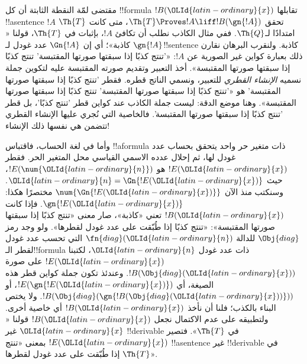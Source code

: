 \documentclass[../../../include/open-logic-section]{subfiles}
\begin{document}


\begin{explain}
مقتضى لمّة النقطة الثابتة أن كل !!{formula} $!B(\OLId{latin-ordinary}{x})$ تقابلها
!!a{sentence} $!A$ تحقق $\Th{T}\Proves !A\liff !B(\gn{!A})$،
متى كانت $\Th{T}$ امتدادًا لـ$\Th{Q}$. ففي مثال الكاذب نطلب
أن تكافئ $!A$، بإثبات في $\Th{T}$، قولنا «$\gn{!A}$ كاذبة»؛
أي إن $\Gn{!A}$ عدد غودل لـ!!{sentence} كاذبة. ولنقرب البرهان
نقارن ذلك بعبارة كواين غير الصورية عن $!A$: «'تنتج كذبًا إذا
سبقتها صورتها المقتبسة' تنتج كذبًا إذا سبقتها صورتها المقتبسة».
أخذ التعبير وتقديم صورته المقتبسة عليه لتكوين جملة نسميه
\emph{الإنشاء القطري} للتعبير، ونسمي الناتج قطره.
فقطر 'تنتج كذبًا إذا سبقتها صورتها المقتبسة' هو «'تنتج كذبًا إذا
سبقتها صورتها المقتبسة' تنتج كذبًا إذا سبقتها صورتها المقتبسة».
وهنا موضع الدقة: ليست جملة الكاذب عند كواين قطر 'تنتج كذبًا'،
بل قطر 'تنتج كذبًا إذا سبقتها صورتها المقتبسة'. فالخاصية التي
نُجري عليها الإنشاء القطري تتضمن هي نفسها ذلك الإنشاء!{}

وأما في لغة الحساب، فاقتباس !!a{formula} ذات متغير حر واحد
يتحقق بحساب عدد غودل لها، ثم إحلال عدده الاسمي القياسي محل
المتغير الحر. فقطر $!E(\OLId{latin-ordinary}{x})$ هو $!E(\num{\OLId{latin-ordinary}{n}})$، حيث
$\OLId{latin-ordinary}{n}=\Gn{!E(\OLId{latin-ordinary}{x})}$. وسنكتب منذ الآن $\num{\Gn{!E(\OLId{latin-ordinary}{x})}}$
مختصرًا هكذا: $\gn{!E(\OLId{latin-ordinary}{x})}$. فإذا كانت $!B(\OLId{latin-ordinary}{x})$ تعني «كاذبة»،
صار معنى «تنتج كذبًا إذا سبقتها صورتها المقتبسة»: «تنتج كذبًا
إذا طُبّقت على عدد غودل لقطرها». ولو وجد رمز $\Obj{diag}$
للدالة $\fn{diag}(\OLId{latin-ordinary}{n})$ التي تحسب عدد غودل لقطر الـ!!{formula}
ذات عدد غودل $\OLId{latin-ordinary}{n}$، لكتبنا $!E(\OLId{latin-ordinary}{x})$ على صورة $!B(\Obj{diag}(\OLId{latin-ordinary}{x}))$.
وعندئذ تكون جملة كواين قطر هذه الصيغة، أي $!E(\gn{!E(\OLId{latin-ordinary}{x})})$،
أو $!B(\Obj{diag}(\gn{!B(\Obj{diag}(\OLId{latin-ordinary}{x}))}))$. ولا يختص البناء
بالكذب؛ فلنا أن نأخذ $!B(\OLId{latin-ordinary}{x})$ أي خاصية أخرى. ولتطبيقه على عدم
الاكتمال نجعل $!B(\OLId{latin-ordinary}{x})$ قولنا «$\OLId{latin-ordinary}{x}$ غير !!{derivable} في
$\Th{T}$». فتصير $!E(\OLId{latin-ordinary}{x})$ بمعنى «تنتج !!a{sentence} غير
!!{derivable} في $\Th{T}$ إذا طُبّقت على عدد غودل لقطرها».


\end{explain}
\end{document}
